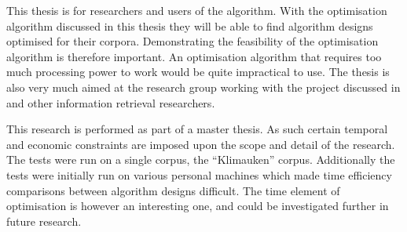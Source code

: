 This thesis is for researchers and users of the \STC algorithm. With the optimisation algorithm discussed in this thesis they will be able to find algorithm designs optimised for their corpora. Demonstrating the feasibility of the optimisation algorithm is therefore important. An optimisation algorithm that requires too much processing power to work would be quite impractical to use. The thesis is also very much aimed at the research group working with the project discussed in  and other information retrieval researchers.

This research is performed as part of a master thesis. As such certain temporal and economic constraints are imposed upon the scope and detail of the research. The tests were run on a single corpus, the ``Klimauken'' corpus. Additionally the tests were initially run on various personal machines which made time efficiency comparisons between algorithm designs difficult. The time element of optimisation is however an interesting one, and could be investigated further in future research.